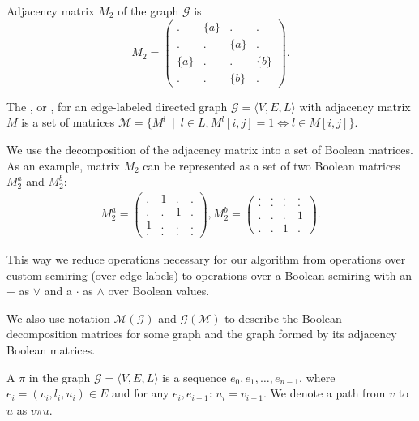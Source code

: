 Adjacency matrix $M_2$ of the graph $\mathcal{G}$ is
$$
    M_2 =
    \begin{pmatrix}
    . & \{a\} & . & .     \\
    . & . & \{a\} & .     \\
    \{a\} & . & . & \{b\} \\
    . & . & \{b\} & .
    \end{pmatrix}.
$$

\begin{definition}
The , or ,
for an edge-labeled directed graph $\mathcal{G} =
\langle V,E,L \rangle$ with adjacency matrix $M$ is a set of matrices $\mathcal{M} = \{ M^l~\mid~l \in L,M^l[i,j] = 1 \iff l \in M[i,j]\}$.
\end{definition}

We use the decomposition of the adjacency matrix into a set of Boolean matrices. As an example, matrix $M_2$ can be represented as a set of two Boolean matrices $M_2^a$ and $M_2^b$:
\begin{align*}
M_2^{a} =
\begin{pmatrix}
    . & 1 & . & .   \\
    . & . & 1 & .   \\
    1 & . & . & .   \\
    . & . & . & .
\end{pmatrix},
M_2^{b} =
\begin{pmatrix}
    . & . & . & .   \\
    . & . & . & .   \\
    . & . & . & 1   \\
    . & . & 1 & .
\end{pmatrix}.
\end{align*}

This way we reduce operations necessary for our algorithm from
operations over custom semiring (over edge labels) to operations over a Boolean semiring with an  $+$ as $\lor$ and a  $\cdot$ as $\land$ over Boolean values.

We also use notation $\mathcal{M}(\mathcal{G})$ and $\mathcal{G}(\mathcal{M})$ to describe the Boolean decomposition matrices for some graph and the graph formed by its adjacency Boolean matrices.

\begin{definition}
A  $\pi$ in the graph $\mathcal{G} = \langle V,E,L \rangle$ is a sequence $e_0,e_1,\ldots,e_{n-1}$, where $e_i = (v_i,l_i,u_i) \in E$ and for any $e_i, e_{i+1}$: $u_i = v_{i+1}$. We denote a path from $v$ to $u$ as $v\pi u$.
\end{definition}


